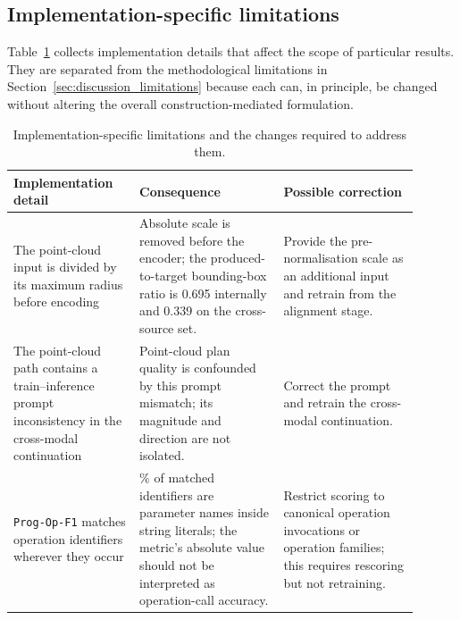 \documentclass[preprint,12pt]{elsarticle}
\begin{document}
\subsection{Implementation-specific limitations}
\label{app:defects}

Table~\ref{tab:defects} collects implementation details that affect the scope
of particular results. They are separated from the methodological limitations
in Section~\ref{sec:discussion_limitations} because each can, in principle,
be changed without altering the overall construction-mediated formulation.

\begin{table}[htbp]
  \centering
  \footnotesize
  \caption{Implementation-specific limitations and the changes required to
    address them.}
  \label{tab:defects}

  \begin{tabular}{
      >{\raggedright\arraybackslash}p{0.28\linewidth}
      >{\raggedright\arraybackslash}p{0.32\linewidth}
      >{\raggedright\arraybackslash}p{0.30\linewidth}
    }
    \toprule
    Implementation detail
     & Consequence
     & Possible correction                                                     \\
    \midrule

    The point-cloud input is divided by its maximum radius before encoding
     & Absolute scale is removed before the encoder; the produced-to-target
    bounding-box ratio is 0.695 internally and 0.339 on the cross-source
    set.
     & Provide the pre-normalisation scale as an additional input and retrain
    from the alignment stage.                                                  \\

    The point-cloud path contains a train--inference prompt inconsistency in
    the cross-modal continuation
     & Point-cloud plan quality is confounded by this prompt mismatch; its
    magnitude and direction are not isolated.
     & Correct the prompt and retrain the cross-modal continuation.            \\

    \texttt{Prog-Op-F1} matches operation identifiers wherever they occur
     & 61.6\% of matched identifiers are parameter names inside string
    literals; the metric's absolute value should not be interpreted as
    operation-call accuracy.
     & Restrict scoring to canonical operation invocations or operation
    families; this requires rescoring but not retraining.                      \\


\end{tabular}
\end{table}
\end{document}
